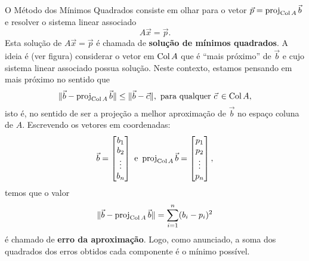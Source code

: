 \documentclass[../livro.tex]{subfiles}  %
\begin{document}
O Método dos Mínimos Quadrados consiste em olhar para o vetor $\vec{p} = \operatorname{proj}_{\operatorname{Col} A} \vec{b}$ e resolver o sistema linear associado
\begin{equation}
A \vec{x} = \vec{p}.
\end{equation} Esta solução de $A \vec{x} = \vec{p}$ é chamada de \textbf{solução de mínimos quadrados}. A ideia é (ver figura) considerar o vetor em $\operatorname{Col} A$ que é ``mais próximo'' de $\vec{b}$ e cujo sistema linear associado possua solução. Neste contexto, estamos pensando em mais próximo no sentido que
\begin{equation}
\| \vec{b} - \operatorname{proj}_{\operatorname{Col} A} \vec{b} \| \le \| \vec{b} - \vec{c} \|, \text{ para qualquer } \vec{c}\, \in \operatorname{Col} A,
\end{equation} isto é, no sentido de ser a projeção a melhor aproximação de $\vec{b}$ no espaço coluna de $A$. Escrevendo os vetores em coordenadas:
\begin{equation}
\vec{b} =
\begin{bmatrix}
  b_1 \\ b_2 \\ \vdots \\ b_n
\end{bmatrix} \ \text{e} \
\operatorname{proj}_{\operatorname{Col} A} \vec{b} =
\begin{bmatrix}
  p_1 \\ p_2 \\ \vdots \\ p_n
\end{bmatrix},
\end{equation} temos que o valor
\begin{equation}
\| \vec{b} - \operatorname{proj}_{\operatorname{Col} A} \vec{b} \| = \sum_{i=1}^n (b_i - p_i)^2
\end{equation} é chamado de \textbf{erro da aproximação}. Logo, como anunciado, a soma dos quadrados dos erros obtidos cada componente é o mínimo possível.
\end{document}
